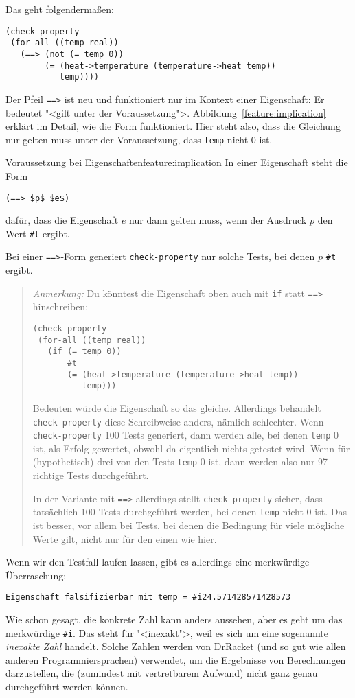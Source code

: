Das geht folgendermaßen:
%
\begin{lstlisting}
(check-property
 (for-all ((temp real))
   (==> (not (= temp 0))
        (= (heat->temperature (temperature->heat temp))
           temp))))
\end{lstlisting}
%
Der Pfeil \lstinline{==>} ist neu und funktioniert nur im Kontext
einer Eigenschaft: Er bedeutet "<gilt unter der Voraussetzung">.
Abbildung~\ref{feature:implication} erklärt im Detail, wie die Form
funktioniert.  Hier steht also, dass die Gleichung nur gelten muss
unter der Voraussetzung, dass \lstinline{temp} nicht 0 ist.

\begin{feature}{Voraussetzung bei Eigenschaften}{feature:implication}
  In einer Eigenschaft steht die Form
\begin{lstlisting}
(==> $p$ $e$)
\end{lstlisting}
  dafür, dass die Eigenschaft $e$ nur dann gelten muss, wenn der
  Ausdruck $p$ den Wert \lstinline{#t} ergibt.

  Bei einer \lstinline{==>}-Form generiert \lstinline{check-property}
  nur solche Tests, bei denen $p$ \lstinline{#t} ergibt.
\end{feature}
%
\begin{quote}
\noindent \emph{Anmerkung:} Du könntest die Eigenschaft oben
auch mit \lstinline{if} statt \lstinline{==>} hinschreiben:
%
\begin{lstlisting}
(check-property
 (for-all ((temp real))
   (if (= temp 0))
       #t
       (= (heat->temperature (temperature->heat temp))
          temp)))
\end{lstlisting}
%
Bedeuten würde die Eigenschaft so das gleiche.  Allerdings behandelt
\lstinline{check-property} diese Schreibweise anders, nämlich
schlechter.  Wenn \lstinline{check-property} 100 Tests generiert, dann
werden alle, bei denen \lstinline{temp} 0 ist, als Erfolg gewertet,
obwohl da eigentlich nichts getestet wird.  Wenn für (hypothetisch)
drei von den Tests \lstinline{temp} 0 ist, dann werden also nur 97
richtige Tests durchgeführt.

In der Variante mit \lstinline{==>} allerdings stellt
\lstinline{check-property} sicher, dass tatsächlich 100 Tests
durchgeführt werden, bei denen \lstinline{temp} nicht 0 ist.  Das ist
besser, vor allem bei Tests, bei denen die Bedingung für viele
mögliche Werte gilt, nicht nur für den einen wie hier.
\end{quote}
%
Wenn wir den Testfall laufen lassen, gibt es allerdings eine
merkwürdige Überraschung:
%
\begin{lstlisting}
Eigenschaft falsifizierbar mit temp = #i24.571428571428573
\end{lstlisting}
%
Wie schon gesagt, die konkrete Zahl kann anders aussehen, aber es geht
um das merkwürdige \mbox{\lstinline{#i}}.  Das steht für "<inexakt">, weil es
sich um eine sogenannte \textit{inexakte Zahl}
handelt.  Solche Zahlen werden von DrRacket (und so gut wie allen
anderen Programmiersprachen) verwendet, um die Ergebnisse von
Berechnungen darzustellen, die (zumindest mit vertretbarem Aufwand)
nicht ganz genau durchgeführt werden können.


